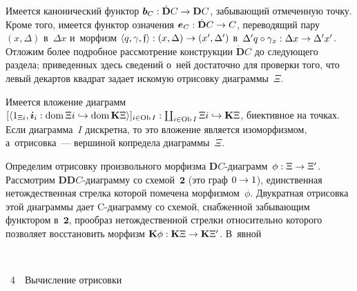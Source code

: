 \begin{multicols}{2}
\vspace*{-3pt}

\noindent
Имеется канонический функтор $\bm{b}_C : 
\dot{\mathbf{D}}C\hm\to \mathbf{D}C$, забывающий отмеченную точку. Кроме 
того, имеется функтор означения $\bm{e}_C : \dot{\mathbf{D}}C \hm\to  C$, 
переводящий пару $(x, \Delta)$ в~$\Delta x$ и~морфизм $\langle q, \gamma, 
\mathfrak{f}\rangle : (x, \Delta) \hm\to  (x^\prime, \Delta^\prime)$ 
в~$\Delta^\prime q \circ \gamma_x : \Delta x \hm\to  \Delta^\prime x^\prime$. 
Отложим более подробное рассмотрение конструкции $\dot{\mathbf{D}}C$ до 
следующего раздела; приведенных здесь сведений о~ней достаточно для 
проверки того, что левый декартов квадрат задает искомую отрисовку 
диаграммы~$\Xi$.


     
     Имеется вложение диаграмм $[\langle 1_{\Xi i}, \bm{i}_i : 
\mathrm{dom}\, \Xi i \hm\hookrightarrow 
\mathrm{dom}\,\mathbf{K}\Xi\rangle]_{i \in \mathrm{Ob}\, I} : \coprod_{i \in \mathrm{Ob}\, I} 
\Xi i \hm\hookrightarrow \mathbf{K}\Xi$, биективное на точках. Если 
диаграмма~$I$ дискретна, то это вложение является изоморфизмом, 
а~отрисовка~--- вершиной копредела диаграммы~$\Xi$.
     
     Определим отрисовку произвольного морфизма  
$\mathbf{D}C$-диа\-грамм~$\phi  : \Xi \hm\to \Xi^\prime$. Рассмотрим 
$\mathbf{DD}C$-диа\-грам\-му со схемой~$\bm{2}$ (это граф $0\hm\to  1$), 
единственная нетождественная стрелка которой помечена морфизмом~$\phi$. 
Двукратная отрисовка этой диаграммы дает C-диа\-грам\-му со схемой, 
снабженной забывающим функтором в~$\bm{2}$, прообраз нетождественной 
стрелки относительно которого позволяет восстановить морфизм 
$\mathbf{K}\phi : \mathbf{K}\Xi \hm\to \mathbf{K}\Xi^\prime$. 
В~явной\linebreak\vspace*{-12pt}

 { \begin{center}  %
 \vspace*{6pt}
    \mbox{%
\epsfxsize=66.827mm 
}


\vspace*{6pt}


\noindent
{{\figurename~4}\ \ \small{Вычисление отрисовки
}}
\end{center}
}


\addtocounter{figure}{1}





\end{multicols}
